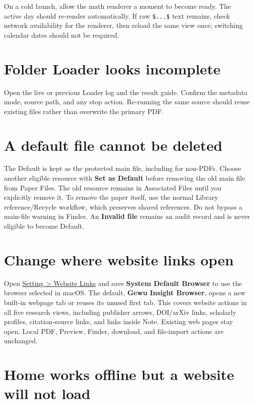 \documentclass[10pt,letterpaper,oneside]{scrreprt}
\begin{document}
On a cold launch, allow the math renderer a moment to become ready. The active day should re-render automatically. If raw \texttt{\$...\$} text remains, check network availability for the renderer, then reload the same view once; switching calendar dates should not be required.

\section{Folder Loader looks incomplete}\label{folder-loader-looks-incomplete}

Open the live or previous Loader log and the result guide. Confirm the metadata mode, source path, and any stop action. Re-running the same source should reuse existing files rather than overwrite the primary PDF.

\section{A default file cannot be deleted}\label{a-default-file-cannot-be-deleted}

The Default is kept as the protected main file, including for non-PDFs. Choose another eligible resource with \textbf{Set as Default} before removing the old main file from Paper Files. The old resource remains in Associated Files until you explicitly remove it. To remove the paper itself, use the normal Library reference/Recycle workflow, which preserves shared references. Do not bypass a main-file warning in Finder. An \textbf{Invalid file} remains an audit record and is never eligible to become Default.

\section{Change where website links open}\label{change-where-website-links-open}

Open \hyperref[website-link-settings]{Setting \textgreater{} Website Links} and save \textbf{System Default Browser} to use the browser selected in macOS. The default, \textbf{Gewu Insight Browser}, opens a new built-in webpage tab or reuses its unused first tab. This covers website actions in all five research views, including publisher arrows, DOI/arXiv links, scholarly profiles, citation-source links, and links inside Note. Existing web pages stay open. Local PDF, Preview, Finder, download, and file-import actions are unchanged.

\section{Home works offline but a website will not load}\label{home-works-offline-but-a-website-will-not-load}
\end{document}
